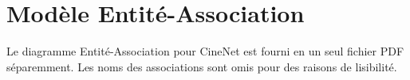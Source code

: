 \section{Modèle Entité-Association}

Le diagramme Entité-Association pour CineNet est fourni en un seul fichier PDF séparemment. Les noms des associations sont omis pour des raisons de lisibilité.
